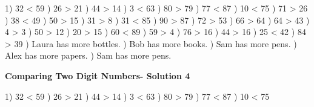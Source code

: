 \documentclass{article}%
\begin{document}
1) 32 < 59%
) 26 > 21%
) 44 > 14%
) 3 < 63%
) 80 > 79%
) 77 < 87%
) 10 < 75%
) 71 > 26%
) 38 < 49%
) 50 > 15%
) 31 > 8%
) 31 < 85%
) 90 > 87%
) 72 > 53%
) 66 > 64%
) 64 > 43%
) 4 > 3%
) 50 > 12%
) 20 > 15%
) 60 < 89%
) 59 > 4%
) 76 > 16%
) 44 > 16%
) 25 < 42%
) 84 > 39%
) Laura has more bottles.%
) Bob has more books.%
) Sam has more pens.%
) Alex has more papers.%
) Sam has more pens.%
\newline%
\newpage%
\large%
\begin{center}%
\textbf{Comparing Two Digit Numbers- Solution 4}%
\newline%
\end{center} \normalsize%
1) 32 < 59%
) 26 > 21%
) 44 > 14%
) 3 < 63%
) 80 > 79%
) 77 < 87%
) 10 < 75%
\newline%
\end{document}
